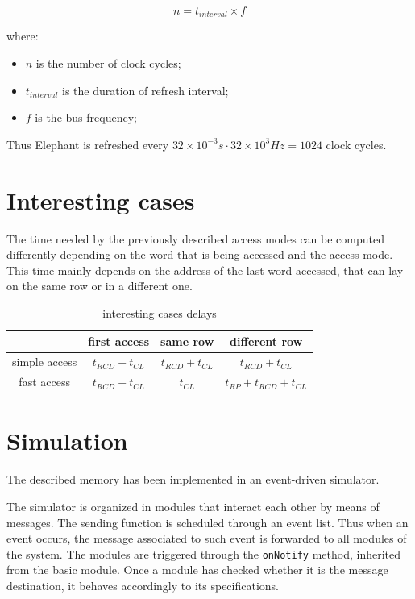 \documentclass[a4paper,12pt]{article}
\newcommand{\memoryname}{Elephant}
\begin{document}
$$ n = t_{interval} \times f $$

where:

\begin{itemize}
  \item $ n $ is the number of clock cycles;
  \item $ t_{interval} $ is the duration of refresh interval;
  \item $ f $ is the bus frequency;
\end{itemize}

Thus \memoryname{} is refreshed every $ 32 \times 10^{-3} s \cdot 32 \times 10^{3} Hz = 1024 $ clock cycles.

\section{Interesting cases}
The time needed by the previously described access modes can be computed differently depending on the word that is being accessed and the access mode.
This time mainly depends on the address of the last word accessed, that can lay on the same row or in a different one.

\begin{table}[H]
\centering
\bgroup
\def\arraystretch{1.5}  %
\begin{tabular}{| c | c | c | c |}\hline
                & first access & same row & different row \\ \hline
  simple access & $t_{RCD} + t_{CL} $ & $t_{RCD} + t_{CL}$ & $t_{RCD} + t_{CL}$\\ \hline
  fast access & $t_{RCD} + t_{CL}$ & $t_{CL}$ & $t_{RP} + t_{RCD} + t_{CL}$ \\ \hline
\end{tabular}
\egroup
\caption{interesting cases delays}
\end{table}

\section{Simulation}
The described memory has been implemented in an event-driven simulator.

The simulator is organized in modules that interact each other by means of messages. The sending function is scheduled through an event list. Thus when an event occurs, the message associated to such event is forwarded to all modules of the system. The modules are triggered through the \texttt{onNotify} method, inherited from the basic module. Once a module has checked whether it is the message destination, it behaves accordingly to its specifications.
\end{document}
